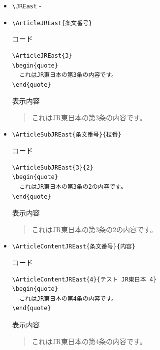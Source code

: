 \documentclass[oneside,10pt,a4paper]{jsarticle}
\begin{document}
  \begin{itemize}
    \item \verb|\JREast| - \JREast
    \item \verb|\ArticleJREast{条文番号}|
      \begin{itembox}[l]{コード}
        \begin{verbatim}
\ArticleJREast{3}
\begin{quote}
  これはJR東日本の第3条の内容です。
\end{quote}\end{verbatim}
      \end{itembox}
      \begin{itembox}[l]{表示内容}
        \begin{quote}
          これはJR東日本の第3条の内容です。
        \end{quote}
      \end{itembox}
    \item \verb|\ArticleSubJREast{条文番号}{枝番}|
      \begin{itembox}[l]{コード}
        \begin{verbatim}
\ArticleSubJREast{3}{2}
\begin{quote}
  これはJR東日本の第3条の2の内容です。
\end{quote}\end{verbatim}
      \end{itembox}
      \begin{itembox}[l]{表示内容}
        \begin{quote}
          これはJR東日本の第3条の2の内容です。
        \end{quote}
      \end{itembox}
    \newpage
    \item \verb|\ArticleContentJREast{条文番号}{内容}|
      \begin{itembox}[l]{コード}
        \begin{verbatim}
\ArticleContentJREast{4}{テスト JR東日本 4}
\begin{quote}
  これはJR東日本の第4条の内容です。
\end{quote}\end{verbatim}
      \end{itembox}
      \begin{itembox}[l]{表示内容}
        \begin{quote}
          これはJR東日本の第4条の内容です。
        \end{quote}

\end{itembox}
\end{itemize}
\end{document}
